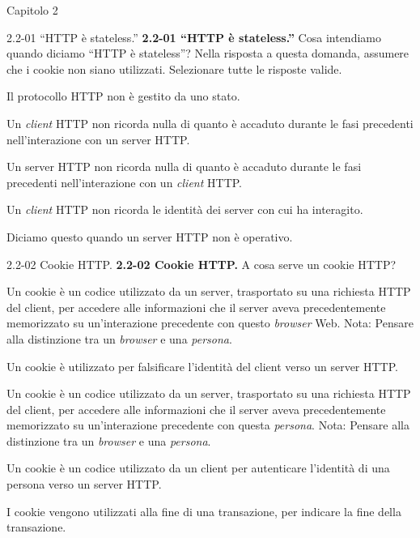 \documentclass[11pt]{article}
\begin{document}
\begin{quiz}{Capitolo 2}
\begin{multi}[points=1,shuffle,multiple]{2.2-01 ``HTTP è stateless.''}
\textbf{2.2-01 ``HTTP è stateless.''} Cosa intendiamo quando diciamo ``HTTP è stateless''? Nella risposta a questa domanda, assumere che i cookie non siano utilizzati. Selezionare tutte le risposte valide.
\item Il protocollo HTTP non è gestito da uno stato.
\item Un \emph{client} HTTP non ricorda nulla di quanto è accaduto durante le fasi precedenti nell'interazione con un server HTTP.
\item* Un server HTTP non ricorda nulla di quanto è accaduto durante le fasi precedenti nell'interazione con un \emph{client} HTTP.
\item Un \emph{client} HTTP non ricorda le identità dei server con cui ha interagito.
\item Diciamo questo quando un server HTTP non è operativo.
\end{multi}

\begin{multi}[points=1,shuffle]{2.2-02 Cookie HTTP.}
\textbf{2.2-02 Cookie HTTP.} A cosa serve un cookie HTTP?
\item* Un cookie è un codice utilizzato da un server, trasportato su una richiesta HTTP del client, per accedere alle informazioni che il server aveva precedentemente memorizzato su un'interazione precedente con questo \emph{browser} Web. Nota: Pensare alla distinzione tra un \emph{browser} e una \emph{persona}.
\item Un cookie è utilizzato per falsificare l'identità del client verso un server HTTP.
\item Un cookie è un codice utilizzato da un server, trasportato su una richiesta HTTP del client, per accedere alle informazioni che il server aveva precedentemente memorizzato su un'interazione precedente con questa \emph{persona}. Nota: Pensare alla distinzione tra un \emph{browser} e una \emph{persona}.
\item Un cookie è un codice utilizzato da un client per autenticare l'identità di una persona verso un server HTTP.
\item I cookie vengono utilizzati alla fine di una transazione, per indicare la fine della transazione.
\end{multi}
            

\end{quiz}
\end{document}
